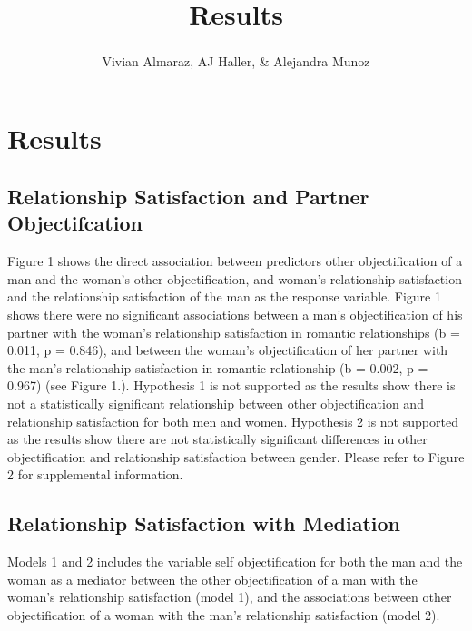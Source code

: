 \documentclass[
  english,
  man,floatsintext]{apa6}
\title{Results}
\author{Vivian Almaraz\textsuperscript{}, AJ Haller\textsuperscript{}, \& Alejandra Munoz\textsuperscript{}}
\date{}
\affiliation{\phantom{0}}
\begin{document}
\maketitle

\hypertarget{results}{%
\section{Results}\label{results}}

\hypertarget{relationship-satisfaction-and-partner-objectifcation}{%
\subsection{Relationship Satisfaction and Partner Objectifcation}\label{relationship-satisfaction-and-partner-objectifcation}}

Figure 1 shows the direct association between predictors other objectification of a man and the woman's other objectification, and woman's relationship satisfaction and the relationship satisfaction of the man as the response variable. Figure 1 shows there were no significant associations between a man's objectification of his partner with the woman's relationship satisfaction in romantic relationships (b = 0.011, p = 0.846), and between the woman's objectification of her partner with the man's relationship satisfaction in romantic relationship (b = 0.002, p = 0.967) (see Figure 1.). Hypothesis 1 is not supported as the results show there is not a statistically significant relationship between other objectification and relationship satisfaction for both men and women. Hypothesis 2 is not supported as the results show there are not statistically significant differences in other objectification and relationship satisfaction between gender. Please refer to Figure 2 for supplemental information.

\hypertarget{relationship-satisfaction-with-mediation}{%
\subsection{Relationship Satisfaction with Mediation}\label{relationship-satisfaction-with-mediation}}

Models 1 and 2 includes the variable self objectification for both the man and the woman as a mediator between the other objectification of a man with the woman's relationship satisfaction (model 1), and the associations between other objectification of a woman with the man's relationship satisfaction (model 2).
\end{document}

